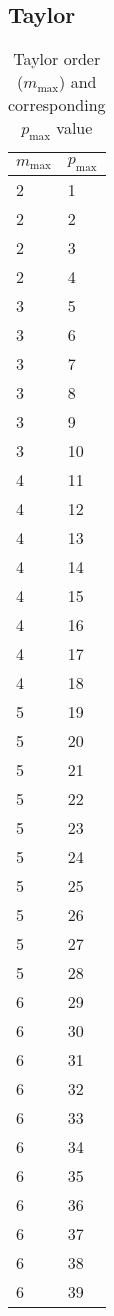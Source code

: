 \FloatBarrier

\subsection{Taylor}

\begin{table}
   \caption{\label{tab:pmax_mmax_values} Taylor order ($m_{\text{max}}$) and corresponding $p_{\text{max}}$ value}
   \centering
   \begin{tabular}{ll}
   \hline
   $m_{\text{max}}$ & $p_{\text{max}}$ \\ 
   \hline
 2 & 1 \\ 
2 & 2 \\ 
2 & 3 \\ 
2 & 4 \\ 
3 & 5 \\ 
3 & 6 \\ 
3 & 7 \\ 
3 & 8 \\ 
3 & 9 \\ 
3 & 10 \\ 
4 & 11 \\
4 & 12 \\ 
4 & 13 \\
4 & 14 \\ 
4 & 15 \\ 
4 & 16 \\ 
4 & 17 \\ 
4 & 18 \\ 
5 & 19 \\ 
5 & 20 \\ 
5 & 21 \\ 
5 & 22 \\ 
5 & 23 \\
5 & 24 \\ 
5 & 25 \\ 
5 & 26 \\ 
5 & 27 \\ 
5 & 28 \\ 
6 & 29 \\ 
6 & 30 \\ 
6 & 31 \\ 
6 & 32 \\ 
6 & 33 \\ 
6 & 34 \\ 
6 & 35 \\ 
6 & 36 \\ 
6 & 37 \\ 
6 & 38 \\
6 & 39 \\ 

\end{tabular}
\end{table}
